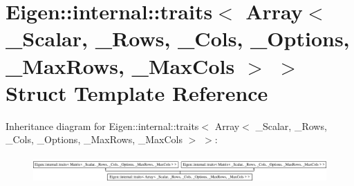 \hypertarget{struct_eigen_1_1internal_1_1traits_3_01_array_3_01___scalar_00_01___rows_00_01___cols_00_01___ope9eba6bf714e124241d092a6dc222cb7}{}\section{Eigen\+:\+:internal\+:\+:traits$<$ Array$<$ \+\_\+\+Scalar, \+\_\+\+Rows, \+\_\+\+Cols, \+\_\+\+Options, \+\_\+\+Max\+Rows, \+\_\+\+Max\+Cols $>$ $>$ Struct Template Reference}
\label{struct_eigen_1_1internal_1_1traits_3_01_array_3_01___scalar_00_01___rows_00_01___cols_00_01___ope9eba6bf714e124241d092a6dc222cb7}
Inheritance diagram for Eigen\+:\+:internal\+:\+:traits$<$ Array$<$ \+\_\+\+Scalar, \+\_\+\+Rows, \+\_\+\+Cols, \+\_\+\+Options, \+\_\+\+Max\+Rows, \+\_\+\+Max\+Cols $>$ $>$\+:\begin{figure}[H]
\begin{center}
\leavevmode
\includegraphics[height=1.035120cm]{struct_eigen_1_1internal_1_1traits_3_01_array_3_01___scalar_00_01___rows_00_01___cols_00_01___ope9eba6bf714e124241d092a6dc222cb7}
\end{center}
\end{figure}
